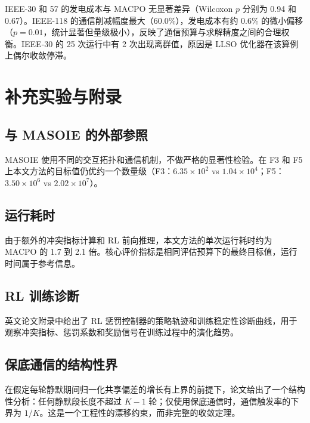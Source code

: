 \documentclass[11pt,a4paper]{ctexart}
\begin{document}
IEEE-30 和 57 的发电成本与 MACPO 无显著差异（Wilcoxon $p$ 分别为 0.94 和 0.67）。IEEE-118 的通信削减幅度最大（60.0\%），发电成本有约 0.6\% 的微小偏移（$p=0.01$，统计显著但量级极小），反映了通信预算与求解精度之间的合理权衡。IEEE-30 的 25 次运行中有 2 次出现离群值，原因是 LLSO 优化器在该算例上偶尔收敛停滞。

\section{补充实验与附录}

\subsection{与 MASOIE 的外部参照}
MASOIE\cite{ref_masoie_2024} 使用不同的交互拓扑和通信机制，不做严格的显著性检验。在 F3 和 F5 上本文方法的目标值仍优约一个数量级（F3：$6.35\times10^2$ vs $1.04\times10^4$；F5：$3.50\times10^6$ vs $2.02\times10^7$）。

\subsection{运行耗时}
由于额外的冲突指标计算和 RL 前向推理，本文方法的单次运行耗时约为 MACPO 的 1.7 到 2.1 倍。核心评价指标是相同评估预算下的最终目标值，运行时间属于参考信息。

\subsection{RL 训练诊断}
英文论文附录中给出了 RL 惩罚控制器的策略轨迹和训练稳定性诊断曲线，用于观察冲突指标、惩罚系数和奖励信号在训练过程中的演化趋势。

\subsection{保底通信的结构性界}
在假定每轮静默期间归一化共享偏差的增长有上界的前提下，论文给出了一个结构性分析：任何静默段长度不超过 $K-1$ 轮；仅使用保底通信时，通信触发率的下界为 $1/K$。这是一个工程性的漂移约束，而非完整的收敛定理。
\end{document}
